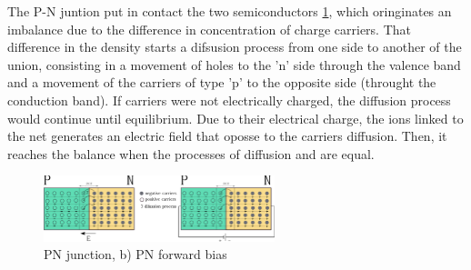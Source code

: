 
The P-N juntion put in contact the two semiconductors \ref{fig:pn}, which oringinates an imbalance due to the difference in concentration of charge carriers. That difference in the density starts a difsusion process from one side to another of the union, consisting in a movement of holes to the 'n' side through the valence band and a movement of the carriers of type 'p' to the opposite side (throught the conduction band). If carriers were not electrically charged, the diffusion process would continue until equilibrium. Due to their electrical charge, the ions linked to the net generates an electric field that oposse to the carriers diffusion. Then, it reaches the balance when the processes of diffusion and are equal.

\begin{figure}[h!]
\centering\includegraphics[width=0.6\textwidth]{figs/unionpn.pdf}
\caption{PN junction, b) PN forward bias}
\label{fig:pn}
\end{figure}


